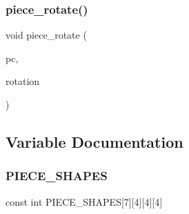 \subsubsection{piece\+\_\+rotate()}
{\footnotesize\ttfamily void piece\+\_\+rotate (\begin{DoxyParamCaption}\item[{struct \textbf{ piece} $\ast$}]{pc,  }\item[{int}]{rotation }\end{DoxyParamCaption})\hspace{0.3cm}{\ttfamily [inline]}}



\subsection{Variable Documentation}
\mbox{\label{piece_8c_aa012dcbe0482f140b29dcdd7e252ebeb}} 
\subsubsection{P\+I\+E\+C\+E\+\_\+\+S\+H\+A\+P\+ES}
{\footnotesize\ttfamily const int P\+I\+E\+C\+E\+\_\+\+S\+H\+A\+P\+ES[7][4][4][4]}

